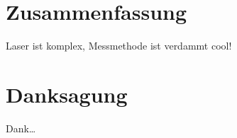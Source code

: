 \documentclass[bachelor,       %
               twoside,        %
               BCOR10mm,       %
               english,ngerman, %
               ]{GAUBM}
\begin{document}
\chapter{Zusammenfassung}
Laser ist komplex, Messmethode ist verdammt cool!


\cleardoublepage
 

\chapter*{Danksagung}
Dank\dots

\Declaration
\end{document}
